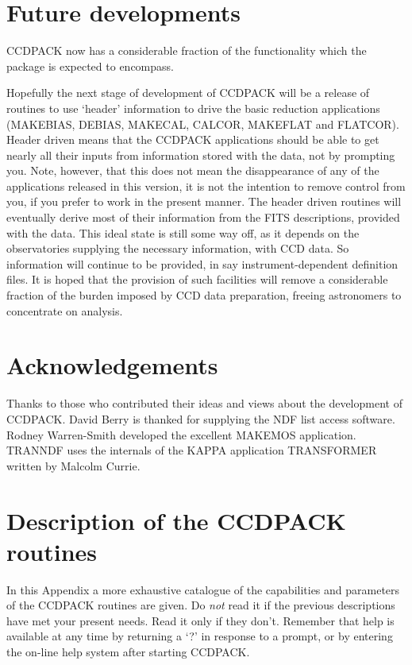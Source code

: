 \section{Future developments}

CCDPACK now has a considerable fraction of the functionality which the
package is expected to encompass.

Hopefully the next stage of development of CCDPACK will be a release of
routines to use `header' information to drive the basic reduction
applications (MAKEBIAS, DEBIAS, MAKECAL, CALCOR, MAKEFLAT and FLATCOR).
Header driven means that the CCDPACK applications should be able to get
nearly all their inputs from information stored with the data, not by
prompting you. Note, however, that this does not mean the disappearance
of any of the applications released in this version, it is not the
intention to remove control from you, if you prefer to work in the
present manner. The header driven routines will eventually derive most
of their information from the FITS descriptions, provided with the data.
This ideal state is still some way off, as it depends on the
observatories supplying the necessary information, with CCD data. So
information will continue to be provided, in say instrument-dependent
definition files. It is hoped that the provision of such facilities will
remove a considerable fraction of the burden imposed by CCD data
preparation, freeing astronomers to concentrate on analysis.

\section{Acknowledgements}

Thanks to those who contributed their ideas and views about the 
development of CCDPACK. David Berry is thanked for supplying
the NDF list access software. Rodney Warren-Smith developed the
excellent MAKEMOS application. TRANNDF uses the internals of the KAPPA
application TRANSFORMER written by Malcolm Currie.

\newpage
\appendix
\section{Description of the CCDPACK routines}
\label{app:description}

In this Appendix a more exhaustive catalogue of the capabilities and parameters
of the CCDPACK routines are given. Do {\em not} read it if the previous
descriptions have met your present needs. Read it only if they don't. Remember
that help is available at any time by returning a `?' in response to a prompt,
or by entering the on-line help system after starting CCDPACK.


